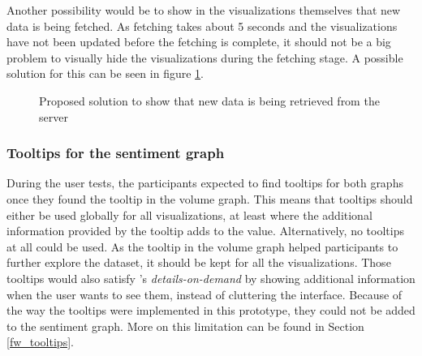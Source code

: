 Another possibility would be to show in the visualizations themselves that new data is being fetched. As fetching takes about 5 seconds and the visualizations have not been updated before the fetching is complete, it should not be a big problem to visually hide the visualizations during the fetching stage. A possible solution for this can be seen in figure \ref{fig:fetching_state}.

\begin{figure}[htb]
    \caption{Proposed solution to show that new data is being retrieved from the server}
    \label{fig:fetching_state}
\end{figure}

\subsubsection*{Tooltips for the sentiment graph}
During the user tests, the participants expected to find tooltips for both graphs once they found the tooltip in the volume graph. This means that tooltips should either be used globally for all visualizations, at least where the additional information provided by the tooltip adds to the value. Alternatively, no tooltips at all could be used. As the tooltip in the volume graph helped participants to further explore the dataset, it should be kept for all the visualizations. Those tooltips would also satisfy \citeauthor{shneidermanEyesHaveIt1996}'s \emph{details-on-demand} by showing additional information when the user wants to see them, instead of cluttering the interface. Because of the way the tooltips were implemented in this prototype, they could not be added to the sentiment graph. More on this limitation can be found in Section \ref{fw_tooltips}.

